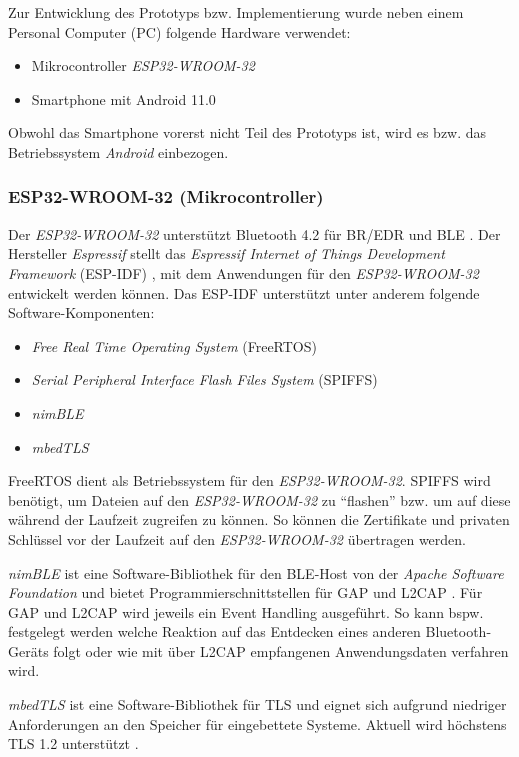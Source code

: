 Zur Entwicklung des Prototyps bzw. Implementierung wurde neben einem Personal Computer (PC) folgende Hardware verwendet:

\begin{itemize}
    \item Mikrocontroller \textit{ESP32-WROOM-32}
    \item Smartphone mit Android 11.0
\end{itemize}

Obwohl das Smartphone vorerst nicht Teil des Prototyps ist, wird es bzw. das Betriebssystem \textit{Android} einbezogen.

\subsubsection{ESP32-WROOM-32 (Mikrocontroller)}
Der \textit{ESP32-WROOM-32} unterstützt Bluetooth 4.2 für BR/EDR und BLE \cite{ESP32_6}. Der Hersteller \textit{Espressif} stellt das \textit{Espressif Internet of Things Development Framework} (ESP-IDF) \cite{ESPIDF}, mit dem Anwendungen für den \textit{ESP32-WROOM-32} entwickelt werden können. Das ESP-IDF unterstützt unter anderem folgende Software-Komponenten:

\begin{itemize}
    \item \textit{Free Real Time Operating System} (FreeRTOS)
    \item \textit{Serial Peripheral Interface Flash Files System} (SPIFFS)
    \item \textit{nimBLE}
    \item \textit{mbedTLS}
\end{itemize}

FreeRTOS dient als Betriebssystem für den \textit{ESP32-WROOM-32}. SPIFFS wird benötigt, um Dateien auf den \textit{ESP32-WROOM-32} zu "`flashen"' bzw. um auf diese während der Laufzeit zugreifen zu können. So können die Zertifikate und privaten Schlüssel vor der Laufzeit auf den \textit{ESP32-WROOM-32} übertragen werden.

\textit{nimBLE} ist eine Software-Bibliothek für den BLE-Host von der \textit{Apache Software Foundation} und bietet Programmierschnittstellen für GAP und L2CAP \cite{nimBLE}. Für GAP und L2CAP wird jeweils ein Event Handling ausgeführt. So kann bspw. festgelegt werden welche Reaktion auf das Entdecken eines anderen Bluetooth-Geräts folgt oder wie mit über L2CAP empfangenen Anwendungsdaten verfahren wird.

\textit{mbedTLS} ist eine Software-Bibliothek für TLS und eignet sich aufgrund niedriger Anforderungen an den Speicher für eingebettete Systeme. Aktuell wird höchstens TLS 1.2 unterstützt \cite{ArmMbedCoreFeatures}.

